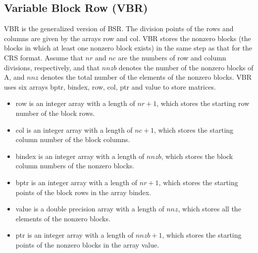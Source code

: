 \documentclass[a4paper]{article}
\begin{document}
\newpage
\subsection{Variable Block Row (VBR)}
VBR is the generalized version of BSR. The division points of the rows and columns are given by the arrays {\ttfamily row} and {\ttfamily col}. 
VBR stores the nonzero blocks (the blocks in which at least one nonzero block exists) in the same step as that for the CRS format. 
Assume that $nr$ and $nc$ are the numbers of row and column divisions, respectively, 
and that $nnzb$ denotes the number of the nonzero blocks of A, 
and $nnz$ denotes the total number of the elements of the nonzero blocks. 
VBR uses six arrays {\ttfamily bptr}, {\ttfamily bindex}, {\ttfamily
row}, {\ttfamily col}, {\ttfamily ptr} and {\ttfamily value} to store matrices.
\begin{itemize}
\item {\ttfamily row} is an integer array with a length of $nr+1$, which
      stores the starting row number of the block rows.
\item {\ttfamily col} is an integer array with a length of $nc+1$, which
      stores the starting column number of the block columns.
\item {\ttfamily bindex} is an integer array with a length of $nnzb$,
      which stores the block column numbers of the nonzero blocks.
\item {\ttfamily bptr} is an integer array with a length of $nr+1$,
      which stores the starting points of the block rows in the array {\ttfamily bindex}.
\item {\ttfamily value} is a double precision array with a length of
      $nnz$, which stores all the elements of the nonzero blocks.
\item {\ttfamily ptr} is an integer array with a length of $nnzb+1$,
      which stores the starting points of the nonzero blocks in the
      array {\ttfamily value}.
\end{itemize}
\end{document}
